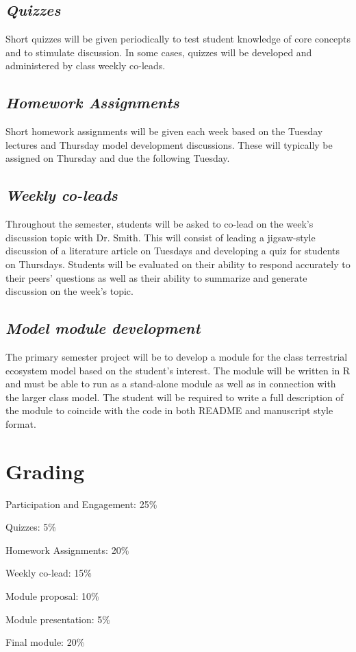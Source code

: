 \documentclass[12pt, notitlepage]{article}   	%
\begin{document}
{\subsection{\textit{Quizzes}}
Short quizzes will be given periodically to test student knowledge of core concepts and to
stimulate discussion. In some cases, quizzes will be developed and administered
by class weekly co-leads.

\subsection{\textit{Homework Assignments}}
Short homework assignments will be given each week based on the Tuesday lectures and
Thursday model development discussions. These will typically be assigned on Thursday and
due the following Tuesday.

\subsection{\textit{Weekly co-leads}}
Throughout the semester, students will be asked to co-lead on the week's discussion
topic with Dr. Smith. This will consist of leading a jigsaw-style discussion of a literature article on Tuesdays
and developing a quiz for students on Thursdays.
Students will be evaluated on their ability to respond accurately to their peers' questions
as well as their ability to summarize and generate discussion on the week's topic.

\subsection{\textit{Model module development}}
The primary semester project will be to develop a module for the class terrestrial ecosystem
model based on the student's interest. The module will be written in R and must be able to
run as a stand-alone module as well as in connection with the larger class model.
The student will be required to write a full description of the module to coincide with the
code in both README and manuscript style format.

\section{Grading}
Participation and Engagement: 25\% \par
Quizzes: 5\% \par
Homework Assignments: 20\% \par
Weekly co-lead: 15\% \par
Module proposal: 10\% \par
Module presentation: 5\% \par
Final module: 20\% \par

}
\end{document}
